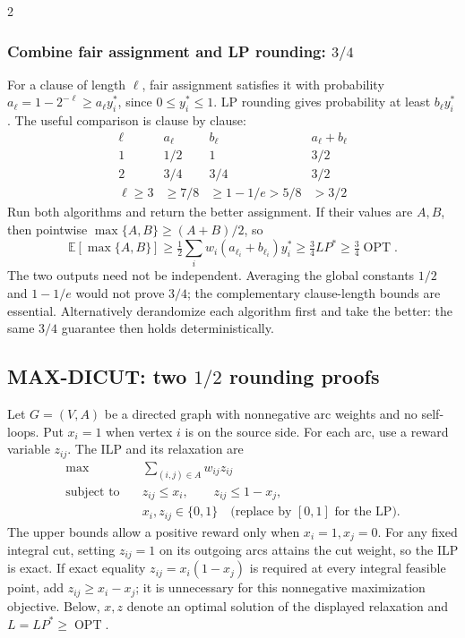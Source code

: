 \documentclass[10pt]{article}
\theoremstyle{definition}
\newcommand{\OPT}{\operatorname{OPT}}
\begin{document}
\begin{multicols*}{2}
\subsubsection*{Combine fair assignment and LP rounding: $3/4$}
For a clause of length $\ell$, fair assignment satisfies it with probability
$a_\ell=1-2^{-\ell}\ge a_\ell y_i^*$, since $0\le y_i^*\le1$.
LP rounding gives probability at least $b_\ell y_i^*$. The useful comparison
is clause by clause:
\[
  \begin{array}{c|c|c|c}
    \ell&a_\ell&b_\ell&a_\ell+b_\ell\\\hline
    1&1/2&1&3/2\\
    2&3/4&3/4&3/2\\
    \ell\ge3&\ge7/8&\ge1-1/e>5/8&>3/2
  \end{array}
\]
Run both algorithms and return the better assignment. If their values are
$A,B$, then pointwise $\max\{A,B\}\ge(A+B)/2$, so
\[
  \mathbb E[\max\{A,B\}]
    \ge\tfrac12\sum_iw_i(a_{\ell_i}+b_{\ell_i})y_i^*
    \ge\tfrac34LP^*\ge\tfrac34\OPT.
\]
The two outputs need not be independent. Averaging the global constants
$1/2$ and $1-1/e$ would not prove $3/4$; the complementary clause-length
bounds are essential. Alternatively derandomize each algorithm first and
take the better: the same $3/4$ guarantee then holds deterministically.

\subsection{MAX-DICUT: two \texorpdfstring{$1/2$}{1/2} rounding proofs}\label{lp:dicut}
Let $G=(V,A)$ be a directed graph with nonnegative arc weights and no
self-loops. Put $x_i=1$ when vertex $i$ is on the source side. For each arc,
use a reward variable $z_{ij}$. The ILP and its relaxation are
\[
  \begin{aligned}
    \max\quad&\sum_{(i,j)\in A}w_{ij}z_{ij}\\
    \text{subject to}\quad&z_{ij}\le x_i,\qquad z_{ij}\le1-x_j,\\
    &x_i,z_{ij}\in\{0,1\}\quad
       \text{(replace by }[0,1]\text{ for the LP).}
  \end{aligned}
\]
The upper bounds allow a positive reward only when $x_i=1,x_j=0$.
For any fixed integral cut, setting $z_{ij}=1$ on its outgoing arcs attains
the cut weight, so the ILP is exact. If exact equality
$z_{ij}=x_i(1-x_j)$ is required at every integral feasible point, add
$z_{ij}\ge x_i-x_j$; it is unnecessary for this nonnegative maximization
objective. Below, $x,z$ denote an optimal solution of the displayed
relaxation and $L=LP^*\ge\OPT$.


\end{multicols*}
\end{document}
